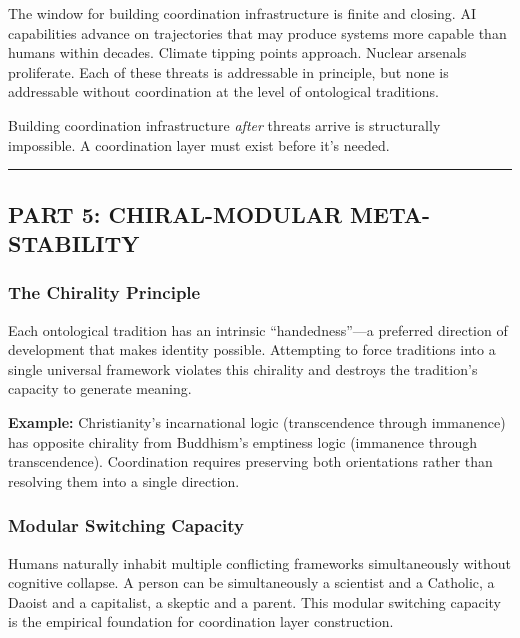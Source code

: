 \documentclass[
]{article}
\begin{document}
The window for building coordination infrastructure is finite and
closing. AI capabilities advance on trajectories that may produce
systems more capable than humans within decades. Climate tipping points
approach. Nuclear arsenals proliferate. Each of these threats is
addressable in principle, but none is addressable without coordination
at the level of ontological traditions.

Building coordination infrastructure \emph{after} threats arrive is
structurally impossible. A coordination layer must exist before it's
needed.

\begin{center}\rule{0.5\linewidth}{0.5pt}\end{center}

\subsection{PART 5: CHIRAL-MODULAR
META-STABILITY}\label{part-5-chiral-modular-meta-stability}

\subsubsection{The Chirality Principle}\label{the-chirality-principle}

Each ontological tradition has an intrinsic ``handedness''---a preferred
direction of development that makes identity possible. Attempting to
force traditions into a single universal framework violates this
chirality and destroys the tradition's capacity to generate meaning.

\textbf{Example:} Christianity's incarnational logic (transcendence
through immanence) has opposite chirality from Buddhism's emptiness
logic (immanence through transcendence). Coordination requires
preserving both orientations rather than resolving them into a single
direction.

\subsubsection{Modular Switching
Capacity}\label{modular-switching-capacity}

Humans naturally inhabit multiple conflicting frameworks simultaneously
without cognitive collapse. A person can be simultaneously a scientist
and a Catholic, a Daoist and a capitalist, a skeptic and a parent. This
modular switching capacity is the empirical foundation for coordination
layer construction.
\end{document}
